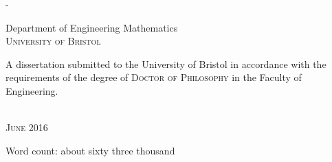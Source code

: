 \begin{titlingpage}
\begin{SingleSpace}
\begin{adjustwidth*}{\unitlength}{-\unitlength}
\begin{center}
\vspace{6mm}
{\large Department of Engineering Mathematics\\
\textsc{University of Bristol}}\\
\vspace{11mm}
\begin{minipage}{10cm}
A dissertation submitted to the University of Bristol in accordance with the requirements of the degree of \textsc{Doctor of Philosophy} in the Faculty of Engineering.
\end{minipage}\\
\vspace{9mm}
{\large\textsc{June 2016}}
\vspace{12mm}
\end{center}
\begin{flushright}
{\small Word count: about sixty three thousand}
\end{flushright}
\end{adjustwidth*}
\end{SingleSpace}
\end{titlingpage}